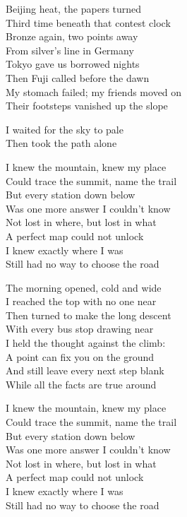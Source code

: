 \begin{lyrics}
Beijing heat, the papers turned\\
Third time beneath that contest clock\\
Bronze again, two points away\\
From silver's line in Germany\\
Tokyo gave us borrowed nights\\
Then Fuji called before the dawn\\
My stomach failed; my friends moved on\\
Their footsteps vanished up the slope

I waited for the sky to pale\\
Then took the path alone

I knew the mountain, knew my place\\
Could trace the summit, name the trail\\
But every station down below\\
Was one more answer I couldn't know\\
Not lost in where, but lost in what\\
A perfect map could not unlock\\
I knew exactly where I was\\
Still had no way to choose the road

The morning opened, cold and wide\\
I reached the top with no one near\\
Then turned to make the long descent\\
With every bus stop drawing near\\
I held the thought against the climb:\\
A point can fix you on the ground\\
And still leave every next step blank\\
While all the facts are true around


I knew the mountain, knew my place\\
Could trace the summit, name the trail\\
But every station down below\\
Was one more answer I couldn't know\\
Not lost in where, but lost in what\\
A perfect map could not unlock\\
I knew exactly where I was\\
Still had no way to choose the road


\end{lyrics}
